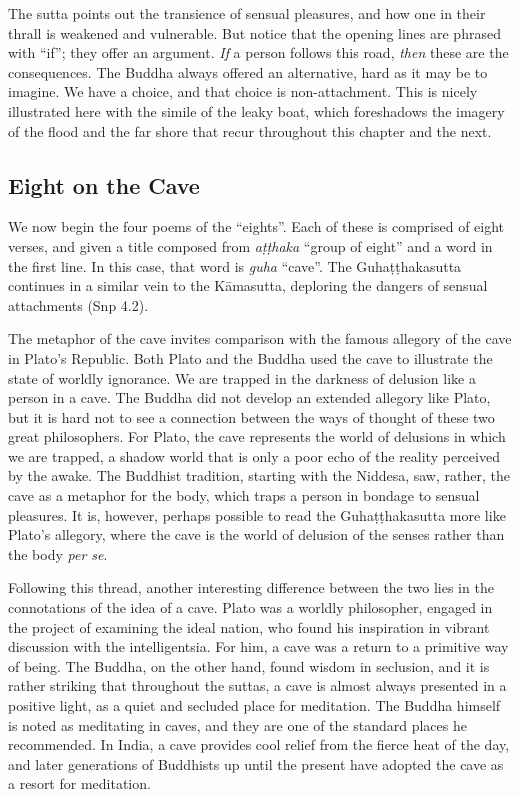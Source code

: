 \documentclass[12pt,openany]{book}%
\begin{document}
The sutta points out the transience of sensual pleasures, and how one in their thrall is weakened and vulnerable. But notice that the opening lines are phrased with “if”; they offer an argument. \emph{If} a person follows this road, \emph{then} these are the consequences. The Buddha always offered an alternative, hard as it may be to imagine. We have a choice, and that choice is non-attachment. This is nicely illustrated here with the simile of the leaky boat, which foreshadows the imagery of the flood and the far shore that recur throughout this chapter and the next.

\subsection*{Eight on the Cave}

We now begin the four poems of the “eights”. Each of these is comprised of eight verses, and given a title composed from \textit{\textsanskrit{aṭṭhaka}} “group of eight” and a word in the first line. In this case, that word is \textit{guha} “cave”. The \textsanskrit{Guhaṭṭhakasutta} continues in a similar vein to the \textsanskrit{Kāmasutta}, deploring the dangers of sensual attachments (Snp 4.2).

The metaphor of the cave invites comparison with the famous allegory of the cave in Plato’s Republic. Both Plato and the Buddha used the cave to illustrate the state of worldly ignorance. We are trapped in the darkness of delusion like a person in a cave. The Buddha did not develop an extended allegory like Plato, but it is hard not to see a connection between the ways of thought of these two great philosophers. For Plato, the cave represents the world of delusions in which we are trapped, a shadow world that is only a poor echo of the reality perceived by the awake. The Buddhist tradition, starting with the Niddesa, saw, rather, the cave as a metaphor for the body, which traps a person in bondage to sensual pleasures. It is, however, perhaps possible to read the \textsanskrit{Guhaṭṭhakasutta} more like Plato’s allegory, where the cave is the world of delusion of the senses rather than the body \emph{per se}.

Following this thread, another interesting difference between the two lies in the connotations of the idea of a cave. Plato was a worldly philosopher, engaged in the project of examining the ideal nation, who found his inspiration in vibrant discussion with the intelligentsia. For him, a cave was a return to a primitive way of being. The Buddha, on the other hand, found wisdom in seclusion, and it is rather striking that throughout the suttas, a cave is almost always presented in a positive light, as a quiet and secluded place for meditation. The Buddha himself is noted as meditating in caves, and they are one of the standard places he recommended. In India, a cave provides cool relief from the fierce heat of the day, and later generations of Buddhists up until the present have adopted the cave as a resort for meditation.
\end{document}
